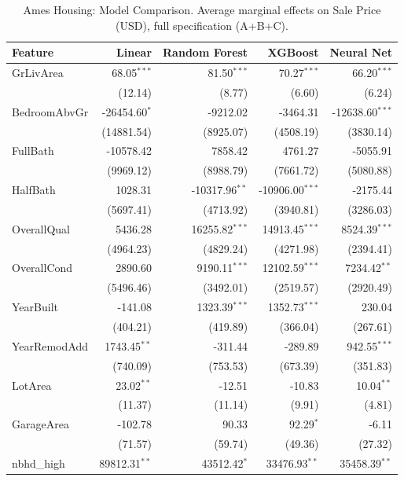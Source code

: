 \documentclass[12pt,a4paper]{article}
\numberwithin{equation}{section}
\theoremstyle{plain}
\theoremstyle{definition}
\begin{document}
	\begin{table}[htbp]
		\centering
		\small
		\begin{threeparttable}
			\caption{Ames Housing: Model Comparison. Average marginal effects on Sale Price (USD), full specification (A+B+C).}
			\label{tab:ames_housing_model_comparison}
			\begin{tabular}{lrrrr}
				\toprule
				Feature & Linear & Random Forest & XGBoost & Neural Net \\
				\midrule
				GrLivArea & 68.05$^{***}$ & 81.50$^{***}$ & 70.27$^{***}$ & 66.20$^{***}$ \\
				& (12.14) & (8.77) & (6.60) & (6.24) \\
				BedroomAbvGr & -26454.60$^{*}$ & -9212.02 & -3464.31 & -12638.60$^{***}$ \\
				& (14881.54) & (8925.07) & (4508.19) & (3830.14) \\
				FullBath & -10578.42 & 7858.42 & 4761.27 & -5055.91 \\
				& (9969.12) & (8988.79) & (7661.72) & (5080.88) \\
				HalfBath & 1028.31 & -10317.96$^{**}$ & -10906.00$^{***}$ & -2175.44 \\
				& (5697.41) & (4713.92) & (3940.81) & (3286.03) \\
				\midrule
				OverallQual & 5436.28 & 16255.82$^{***}$ & 14913.45$^{***}$ & 8524.39$^{***}$ \\
				& (4964.23) & (4829.24) & (4271.98) & (2394.41) \\
				OverallCond & 2890.60 & 9190.11$^{***}$ & 12102.59$^{***}$ & 7234.42$^{**}$ \\
				& (5496.46) & (3492.01) & (2519.57) & (2920.49) \\
				YearBuilt & -141.08 & 1323.39$^{***}$ & 1352.73$^{***}$ & 230.04 \\
				& (404.21) & (419.89) & (366.04) & (267.61) \\
				YearRemodAdd & 1743.45$^{**}$ & -311.44 & -289.89 & 942.55$^{***}$ \\
				& (740.09) & (753.53) & (673.39) & (351.83) \\
				\midrule
				LotArea & 23.02$^{**}$ & -12.51 & -10.83 & 10.04$^{**}$ \\
				& (11.37) & (11.14) & (9.91) & (4.81) \\
				GarageArea & -102.78 & 90.33 & 92.29$^{*}$ & -6.11 \\
				& (71.57) & (59.74) & (49.36) & (27.32) \\
				nbhd\_high & 89812.31$^{**}$ & 43512.42$^{*}$ & 33476.93$^{**}$ & 35458.39$^{**}$ \\

\end{tabular}
\end{threeparttable}
\end{table}
\end{document}
